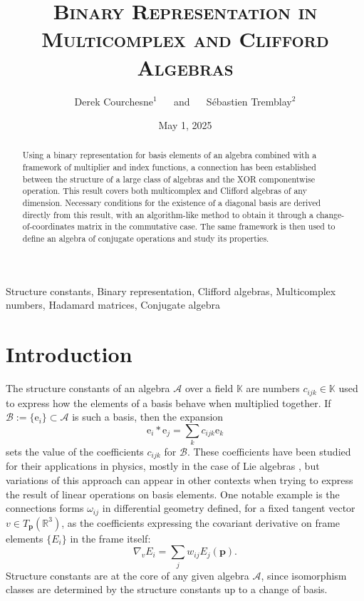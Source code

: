 \documentclass{article}
\title {\textsc{Binary Representation in Multicomplex and Clifford Algebras}}
\author{Derek Courchesne$^1$ $\quad$ and $\quad$ Sébastien Tremblay$^2$}
\date{May 1, 2025}
\begin{document}

\maketitle

\begin{abstract}
Using a binary representation for basis elements of an algebra combined with a framework of multiplier and index functions, a connection has been established between the structure of a large class of algebras and the XOR componentwise operation. This result covers both multicomplex and Clifford algebras of any dimension. Necessary conditions for the existence of a diagonal basis are derived directly from this result, with an algorithm-like method to obtain it through a change-of-coordinates matrix in the commutative case. The same framework is then used to define an algebra of conjugate operations and study its properties.
\end{abstract}

 Structure constants, Binary representation, Clifford algebras, Multicomplex numbers, Hadamard matrices, Conjugate algebra

\section{Introduction}

The structure constants of an algebra $\mathcal{A}$ over a field $\mathbb{K}$ are numbers $c_{ijk} \in \mathbb{K}$ used to express how the elements of a basis behave when multiplied together. If $\mathcal{B}:=\{\mathrm{e}_i\} \subset \mathcal{A}$ is such a basis, then the expansion
$$ \mathrm{e}_i*\mathrm{e}_j = \sum_k c_{ijk} \mathrm{e}_k $$
sets the value of the coefficients $c_{ijk}$ for $\mathcal{B}$. These coefficients have been studied for their applications in physics, mostly in the case of Lie algebras \cite{georgi,HumphreysLieAlg}, but variations of this approach can appear in other contexts when trying to express the result of linear operations on basis elements. One notable example is the connections forms $\omega_{ij}$ in differential geometry \cite{oneill} defined, for a fixed tangent vector $v \in T_{\mathbf{p}}(\mathbb{R}^3)$, as the coefficients expressing the covariant derivative on frame elements $\{E_i\}$ in the frame itself:
$$ \nabla_vE_i = \sum_jw_{ij}E_j(\mathbf{p}). $$
Structure constants are at the core of any given algebra $\mathcal{A}$, since isomorphism classes are determined by the structure constants up to a change of basis.
\end{document}
